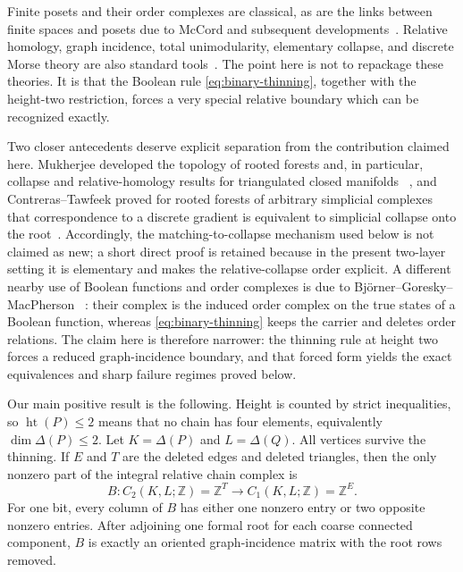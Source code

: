 \documentclass[11pt]{article}
\theoremstyle{definition}
\theoremstyle{remark}
\DeclareMathOperator{\posht}{ht}
\newcommand{\Z}{\mathbb Z}
\newcommand{\D}{\Delta}
\begin{document}
Finite posets and their order complexes are classical, as are the links between finite
spaces and posets due to McCord and subsequent developments~\cite{McCord1966,Barmak2011A,BarmakBook}.
Relative homology, graph incidence, total unimodularity, elementary collapse, and
discrete Morse theory are also standard tools~\cite{Hatcher2002,Forman1998,Kozlov2008,DeyHiraniKrishnamoorthy2011}.
The point here is not to repackage these theories.  It is that the Boolean rule
\eqref{eq:binary-thinning}, together with the height-two restriction, forces a very
special relative boundary which can be recognized exactly.

Two closer antecedents deserve explicit separation from the contribution claimed here.
Mukherjee developed the topology of rooted forests and, in particular, collapse and
relative-homology results for triangulated closed manifolds
~\cite{Mukherjee2018,Mukherjee2020}, and Contreras--Tawfeek proved for
rooted forests of arbitrary simplicial complexes that correspondence to a discrete
gradient is equivalent to simplicial collapse onto the root~\cite{ContrerasTawfeek2024}.
Accordingly, the matching-to-collapse mechanism used below is not claimed as new; a
short direct proof is retained because in the present two-layer setting it is elementary
and makes the relative-collapse order explicit.  A different nearby use of Boolean
functions and order complexes is due to Bj\"orner--Goresky--MacPherson
~\cite{BjornerGoreskyMacPherson2024}: their complex is the induced order complex on the
true states of a Boolean function, whereas \eqref{eq:binary-thinning} keeps the carrier
and deletes order relations.  The claim here is therefore narrower: the thinning rule
at height two forces a reduced graph-incidence boundary, and that forced form yields
the exact equivalences and sharp failure regimes proved below.

Our main positive result is the following.  Height is counted by strict inequalities,
so $\posht(P)\le2$ means that no chain has four elements, equivalently $\dim\D(P)\le2$.
Let $K=\D(P)$ and $L=\D(Q)$.  All vertices survive the thinning.  If $E$ and $T$ are
the deleted edges and deleted triangles, then the only nonzero part of the integral
relative chain complex is
\[
  B:C_2(K,L;\Z)=\Z^T\longrightarrow C_1(K,L;\Z)=\Z^E.
\]
For one bit, every column of $B$ has either one nonzero entry or two opposite nonzero
entries.  After adjoining one formal root for each coarse connected component, $B$
is exactly an oriented graph-incidence matrix with the root rows removed.
\end{document}
